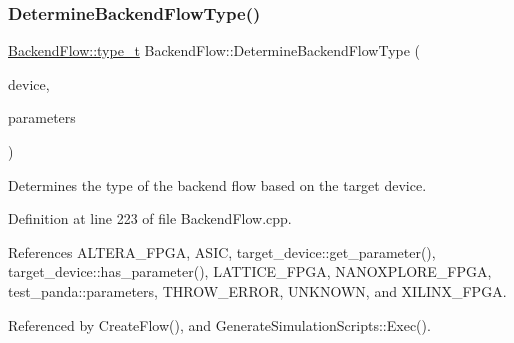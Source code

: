 \subsubsection{\texorpdfstring{Determine\+Backend\+Flow\+Type()}{DetermineBackendFlowType()}}
{\footnotesize\ttfamily \hyperlink{classBackendFlow_ac342772f1d3890eb1aad9a8de911da08}{Backend\+Flow\+::type\+\_\+t} Backend\+Flow\+::\+Determine\+Backend\+Flow\+Type (\begin{DoxyParamCaption}\item[{const \hyperlink{target__device_8hpp_acedb2b7a617e27e6354a8049fee44eda}{target\+\_\+device\+Ref}}]{device,  }\item[{const \hyperlink{Parameter_8hpp_a37841774a6fcb479b597fdf8955eb4ea}{Parameter\+Const\+Ref}}]{parameters }\end{DoxyParamCaption})\hspace{0.3cm}{\ttfamily [static]}}



Determines the type of the backend flow based on the target device. 



Definition at line 223 of file Backend\+Flow.\+cpp.



References A\+L\+T\+E\+R\+A\+\_\+\+F\+P\+GA, A\+S\+IC, target\+\_\+device\+::get\+\_\+parameter(), target\+\_\+device\+::has\+\_\+parameter(), L\+A\+T\+T\+I\+C\+E\+\_\+\+F\+P\+GA, N\+A\+N\+O\+X\+P\+L\+O\+R\+E\+\_\+\+F\+P\+GA, test\+\_\+panda\+::parameters, T\+H\+R\+O\+W\+\_\+\+E\+R\+R\+OR, U\+N\+K\+N\+O\+WN, and X\+I\+L\+I\+N\+X\+\_\+\+F\+P\+GA.



Referenced by Create\+Flow(), and Generate\+Simulation\+Scripts\+::\+Exec().

